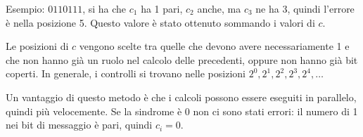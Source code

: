 Esempio: $0110111$, si ha che $c_1$ ha 1 pari, $c_2$ anche, ma $c_3$ ne ha 3, quindi l'errore è nella posizione 5. Questo valore è stato ottenuto sommando i valori di $c$.

Le posizioni di $c$ vengono scelte tra quelle che devono avere necessariamente 1 e che non hanno già un ruolo nel calcolo delle precedenti, oppure non hanno già bit coperti. In generale, i controlli si trovano nelle posizioni $2^0, 2^1, 2^2, 2^3, 2^4, \dots$

Un vantaggio di questo metodo è che i calcoli possono essere eseguiti in parallelo, quindi più velocemente. Se la sindrome è 0 non ci sono stati errori: il numero di 1 nei bit di messaggio è pari, quindi $c_i = 0$.



